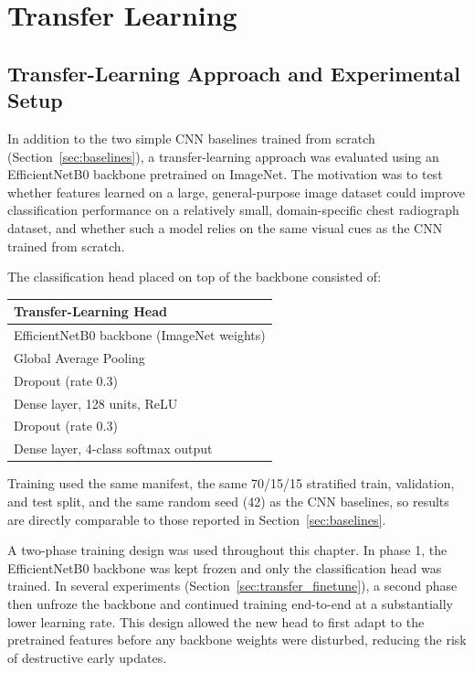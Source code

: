 \chapter{Transfer Learning}


\section{Transfer-Learning Approach and Experimental Setup}
\label{sec:transfer_setup}

In addition to the two simple CNN baselines trained from scratch
(Section~\ref{sec:baselines}), a transfer-learning approach was evaluated
using an EfficientNetB0 backbone pretrained on ImageNet. The motivation was
to test whether features learned on a large, general-purpose image dataset
could improve classification performance on a relatively small,
domain-specific chest radiograph dataset, and whether such a model relies on
the same visual cues as the CNN trained from scratch.

The classification head placed on top of the backbone consisted of:

\begin{center}
\begin{tabular}{l}
\toprule
\textbf{Transfer-Learning Head} \\
\midrule
EfficientNetB0 backbone (ImageNet weights) \\
Global Average Pooling \\
Dropout (rate 0.3) \\
Dense layer, 128 units, ReLU \\
Dropout (rate 0.3) \\
Dense layer, 4-class softmax output \\
\bottomrule
\end{tabular}
\end{center}

Training used the same manifest, the same 70/15/15 stratified train,
validation, and test split, and the same random seed (42) as the CNN
baselines, so results are directly comparable to those reported in
Section~\ref{sec:baselines}.

A two-phase training design was used throughout this chapter. In phase 1,
the EfficientNetB0 backbone was kept frozen and only the classification head
was trained. In several experiments (Section~\ref{sec:transfer_finetune}),
a second phase then unfroze the backbone and continued training end-to-end
at a substantially lower learning rate. This design allowed the new head to
first adapt to the pretrained features before any backbone weights were
disturbed, reducing the risk of destructive early updates.

